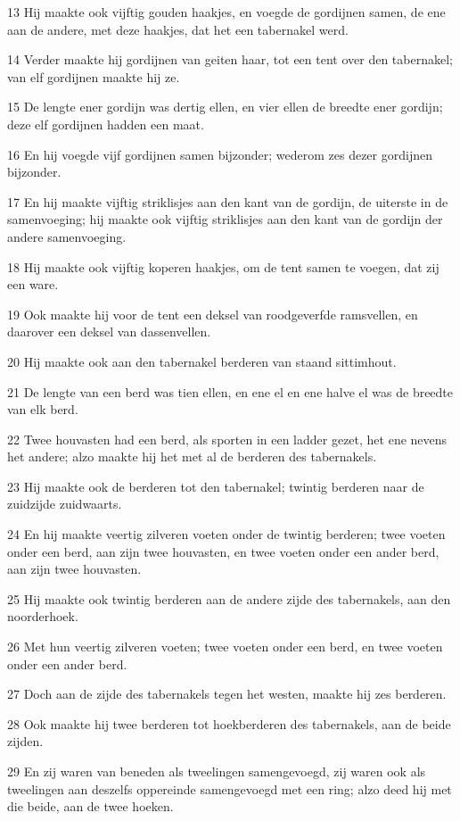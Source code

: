 \par 13 Hij maakte ook vijftig gouden haakjes, en voegde de gordijnen samen, de ene aan de andere, met deze haakjes, dat het een tabernakel werd.
\par 14 Verder maakte hij gordijnen van geiten haar, tot een tent over den tabernakel; van elf gordijnen maakte hij ze.
\par 15 De lengte ener gordijn was dertig ellen, en vier ellen de breedte ener gordijn; deze elf gordijnen hadden een maat.
\par 16 En hij voegde vijf gordijnen samen bijzonder; wederom zes dezer gordijnen bijzonder.
\par 17 En hij maakte vijftig striklisjes aan den kant van de gordijn, de uiterste in de samenvoeging; hij maakte ook vijftig striklisjes aan den kant van de gordijn der andere samenvoeging.
\par 18 Hij maakte ook vijftig koperen haakjes, om de tent samen te voegen, dat zij een ware.
\par 19 Ook maakte hij voor de tent een deksel van roodgeverfde ramsvellen, en daarover een deksel van dassenvellen.
\par 20 Hij maakte ook aan den tabernakel berderen van staand sittimhout.
\par 21 De lengte van een berd was tien ellen, en ene el en ene halve el was de breedte van elk berd.
\par 22 Twee houvasten had een berd, als sporten in een ladder gezet, het ene nevens het andere; alzo maakte hij het met al de berderen des tabernakels.
\par 23 Hij maakte ook de berderen tot den tabernakel; twintig berderen naar de zuidzijde zuidwaarts.
\par 24 En hij maakte veertig zilveren voeten onder de twintig berderen; twee voeten onder een berd, aan zijn twee houvasten, en twee voeten onder een ander berd, aan zijn twee houvasten.
\par 25 Hij maakte ook twintig berderen aan de andere zijde des tabernakels, aan den noorderhoek.
\par 26 Met hun veertig zilveren voeten; twee voeten onder een berd, en twee voeten onder een ander berd.
\par 27 Doch aan de zijde des tabernakels tegen het westen, maakte hij zes berderen.
\par 28 Ook maakte hij twee berderen tot hoekberderen des tabernakels, aan de beide zijden.
\par 29 En zij waren van beneden als tweelingen samengevoegd, zij waren ook als tweelingen aan deszelfs oppereinde samengevoegd met een ring; alzo deed hij met die beide, aan de twee hoeken.
